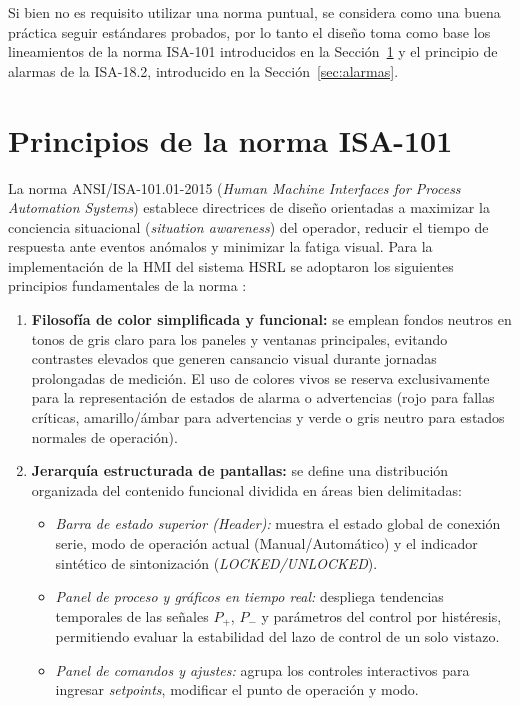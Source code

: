 Si bien no es requisito utilizar una norma puntual, se considera como una buena práctica seguir estándares probados, por lo tanto el diseño toma como base los lineamientos de la norma ISA-101 introducidos en la Sección~\ref{sec:isa101} y el principio de alarmas de la ISA-18.2, introducido en la Sección~\ref{sec:alarmas}.

\section{Principios de la norma ISA-101}
\label{sec:isa101}

La norma ANSI/ISA-101.01-2015 (\emph{Human Machine Interfaces for Process Automation Systems}) establece directrices de diseño orientadas a maximizar la conciencia situacional (\emph{situation awareness}) del operador, reducir el tiempo de respuesta ante eventos anómalos y minimizar la fatiga visual. Para la implementación de la HMI del sistema HSRL se adoptaron los siguientes principios fundamentales de la norma \cite{isa101}:

\begin{enumerate}
    \item \textbf{Filosofía de color simplificada y funcional:} se emplean fondos neutros en tonos de gris claro para los paneles y ventanas principales, evitando contrastes elevados que generen cansancio visual durante jornadas prolongadas de medición. El uso de colores vivos se reserva exclusivamente para la representación de estados de alarma o advertencias (rojo para fallas críticas, amarillo/ámbar para advertencias y verde o gris neutro para estados normales de operación).
    \item \textbf{Jerarquía estructurada de pantallas:} se define una distribución organizada del contenido funcional dividida en áreas bien delimitadas:
    \begin{itemize}
        \item \emph{Barra de estado superior (Header):} muestra el estado global de conexión serie, modo de operación actual (Manual/Automático) y el indicador sintético de sintonización (\emph{LOCKED/UNLOCKED}).
        \item \emph{Panel de proceso y gráficos en tiempo real:} despliega tendencias temporales de las señales $P_+$, $P_-$ y parámetros del control por histéresis, permitiendo evaluar la estabilidad del lazo de control de un solo vistazo.
        \item \emph{Panel de comandos y ajustes:} agrupa los controles interactivos para ingresar \emph{setpoints}, modificar el punto de operación y modo.
    \end{itemize}
\end{enumerate}

